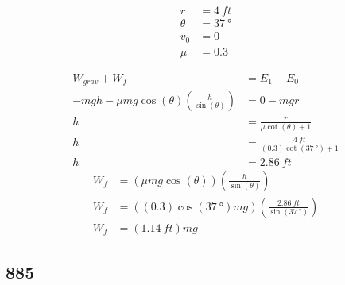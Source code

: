 \documentclass{article}
\begin{document}
\begin{align*}
	r & = \SI{4}{ft} \\
	\theta & = \SI{37}{\degree} \\
	v_0 & = 0 \\
	\mu & = 0.3
\end{align*}
\begin{align*}
	W_{grav} + W_f & = E_1 - E_0 \\
	-mgh - \mu mg\cos(\theta)\left( \frac{h}{\sin(\theta)} \right) & = 0 - mgr \\
	h & = \frac{r}{\mu \cot(\theta) + 1} \\
	h & = \frac{\SI{4}{ft}}{(0.3)\cot(\SI{37}{\degree}) + 1} \\
	h & = \SI{2.86}{ft}
\end{align*}
\begin{align*}
	W_f & = \left( \mu mg\cos(\theta) \right) \left( \frac{h}{\sin(\theta)} \right) \\
	W_f & = \left( (0.3)\cos(\SI{37}{\degree})mg \right) \left( \frac{\SI{2.86}{ft}}{\sin(\SI{37}{\degree})} \right) \\
	W_f & = (\SI{1.14}{ft})mg
\end{align*}

\subsection{885}
\end{document}
